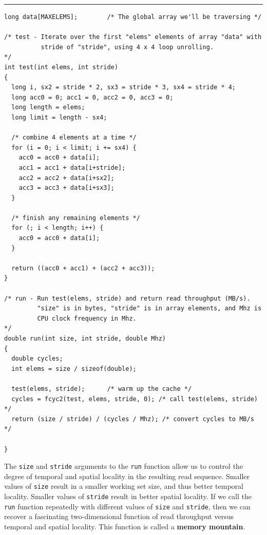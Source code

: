 \documentclass[11pt]{article}
\begin{document}
\noindent\rule{\textwidth}{0.5pt}
\begin{verbatim}
long data[MAXELEMS];		/* The global array we'll be traversing */

/* test - Iterate over the first "elems" elements of array "data" with
          stride of "stride", using 4 x 4 loop unrolling.
*/
int test(int elems, int stride)
{
  long i, sx2 = stride * 2, sx3 = stride * 3, sx4 = stride * 4;
  long acc0 = 0; acc1 = 0, acc2 = 0, acc3 = 0;
  long length = elems;
  long limit = length - sx4;

  /* combine 4 elements at a time */
  for (i = 0; i < limit; i += sx4) {
    acc0 = acc0 + data[i];
    acc1 = acc1 + data[i+stride];
    acc2 = acc2 + data[i+sx2];
    acc3 = acc3 + data[i+sx3];
  }

  /* finish any remaining elements */
  for (; i < length; i++) {
    acc0 = acc0 + data[i];
  }

  return ((acc0 + acc1) + (acc2 + acc3));
}

/* run - Run test(elems, stride) and return read throughput (MB/s).
         "size" is in bytes, "stride" is in array elements, and Mhz is
         CPU clock frequency in Mhz.
*/
double run(int size, int stride, double Mhz)
{
  double cycles;
  int elems = size / sizeof(double);

  test(elems, stride);		/* warm up the cache */
  cycles = fcyc2(test, elems, stride, 0); /* call test(elems, stride) */
  return (size / stride) / (cycles / Mhz); /* convert cycles to MB/s */

}

\end{verbatim}

The \texttt{size} and \texttt{stride} arguments to the \texttt{run} function allow us to control the degree of temporal and spatial locality in the resulting read sequence. Smaller values of \texttt{size} result in a smaller working set size, and thus better temporal locality. Smaller values of \texttt{stride} result in better spatial locality. If we call the \texttt{run} function repeatedly with different values of \texttt{size} and \texttt{stride}, then we can recover a fascinating two-dimensional function of read throughput versus temporal and spatial locality. This function is called a \textbf{memory mountain}.\\
\end{document}
